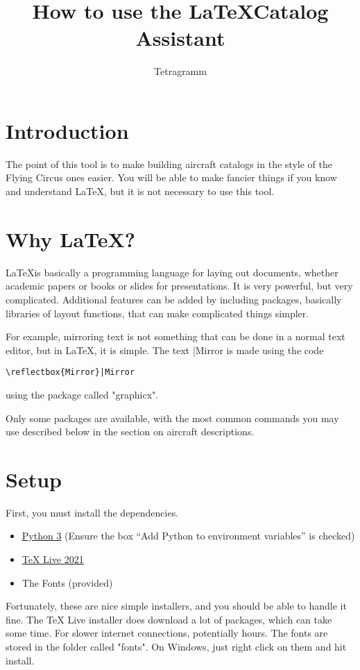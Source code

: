 \documentclass{article}
\title{How to use the \LaTeX Catalog Assistant}
\author{Tetragramm}
\begin{document}
\maketitle
\section{Introduction}
The point of this tool is to make building aircraft catalogs in the style of the Flying Circus ones easier.  You will be able to make fancier things if you know and understand \LaTeX, but it is not necessary to use this tool.
\section{Why \LaTeX?}
\LaTeX is basically a programming language for laying out documents, whether academic papers or books or slides for presentations.  It is very powerful, but very complicated.  Additional features can be added by including packages, basically libraries of layout functions, that can make complicated things simpler.

For example, mirroring text is not something that can be done in a normal text editor, but in \LaTeX, it is simple.  The text |Mirror is made using the code \begin{verbatim}\reflectbox{Mirror}|Mirror\end{verbatim} using the package called "graphicx".

Only some packages are available, with the most common commands you may use described below in the section on aircraft descriptions.
\section{Setup}
First, you must install the dependencies.
\begin{itemize}
    \item \href{https://www.python.org/}{\color{blue}\underline{Python 3}}  (Ensure the box ``Add Python to environment variables'' is checked)
    \item \href{https://tug.org/texlive/}{\color{blue}\underline{TeX Live 2021}}
    \item The Fonts (provided)
\end{itemize}
Fortunately, these are nice simple installers, and you should be able to handle it fine.  The TeX Live installer does download a lot of packages, which can take some time.  For slower internet connections, potentially hours.  The fonts are stored in the folder called "fonts".  On Windows, just right click on them and hit install.
\end{document}
